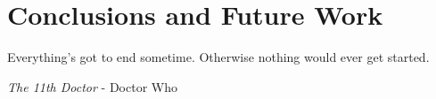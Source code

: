 \chapter{Conclusions and Future Work}
\label{chapter:conclusions}
\epigraph{Everything’s got to end sometime. Otherwise nothing would ever get started.}{\textit{The 11th Doctor} - Doctor Who}